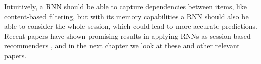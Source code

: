 Intuitively, a RNN should be able to capture dependencies between items, like content-based filtering, but with its memory capabilities a RNN should also be able to consider the whole session, which could lead to more accurate predictions. Recent papers have shown promising results in applying RNNs as session-based recommenders \cite{DBLP:journals/corr/HidasiKBT15} \cite{DBLP:journals/corr/TanXL16} \cite{ZALANDO:understanding-consumer-histories}, and in the next chapter we look at these and other relevant papers.
